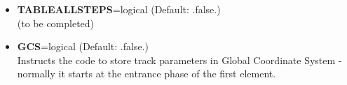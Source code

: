 \begin{itemize}
  \item {\bf TABLEALLSTEPS}=logical (Default: .false.)\\
    (to be completed)

  \item {\bf GCS}=logical (Default: .false.)\\ 
    Instructs the code to store track parameters in Global Coordinate
    System - normally it starts at the entrance phase of the first
    element.  
\end{itemize}



